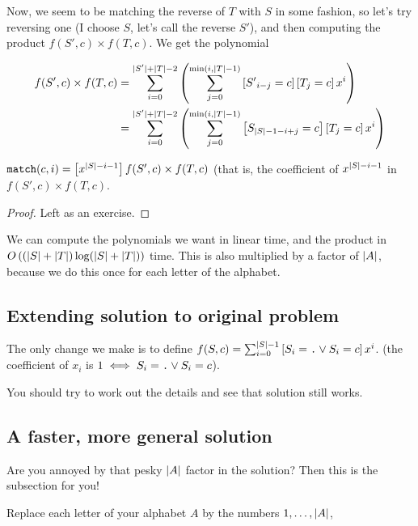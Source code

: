 		Now, we seem to be matching the reverse of $T$ with $S$ in some fashion, so
		let's try reversing one (I choose $S$, let's call the reverse $S'$), and then
		computing the product $f(S', c) \times f(T, c)$.
		We get the polynomial

		\begin{align*}
			f(S', c) \times f(T, c) &= 
			\sum_{i = 0}^{\mid S'\mid + \mid T\mid - 2} \left(\sum_{j = 0}^{\min(i, \mid T\mid - 1)}
			\left[{S'}_{i - j} = c\right]\left[T_{j} = c\right] x^i\right)\\
			&= \sum_{i = 0}^{\mid S'\mid + \mid T\mid - 2} \left(\sum_{j = 0}^{\min(i, \mid T\mid - 1)}
			\left[{S}_{\mid S\mid - 1 - i + j} = c\right]\left[T_{j} = c\right] x^i \right)\\
		\end{align*}

		\begin{claim}
			$\texttt{match}(c, i) = \left[x^{\mid S\mid - i - 1}\right] f(S', c)\times f(T, c)$
			(that is, the coefficient of $x^{\mid S\mid - i - 1}$ in $f(S', c) \times f(T, c)$.
		\end{claim}

		\begin{proof}
			Left as an exercise.
		\end{proof}

		We can compute the polynomials we want in linear time, and the product in
		$\bigO{(\card{S} + \card{T}) \log (\card{S} + \card{T})}$ time.
		This is also multiplied by a factor of $\card{A}$, because we do this once
		for each letter of the alphabet.

	\subsection{Extending solution to original problem}
		The only change we make is to define $f(S, c) = 
		\sum_{i = 0}^{\mid S\mid - 1} \left[S_i = \texttt{.} \vee S_i = c\right] x^i$.
		(the coefficient of $x_i$ is $1 \iff S_i = \texttt{.} \vee S_i = c$).

		You should try to work out the details and see that solution still works.

	\subsection{A faster, more general solution}
		Are you annoyed by that pesky $\card{A}$ factor in the solution?
		Then this is the subsection for you!

		Replace each letter of your alphabet $A$ by the numbers $1, \dots , \card{A}$,

